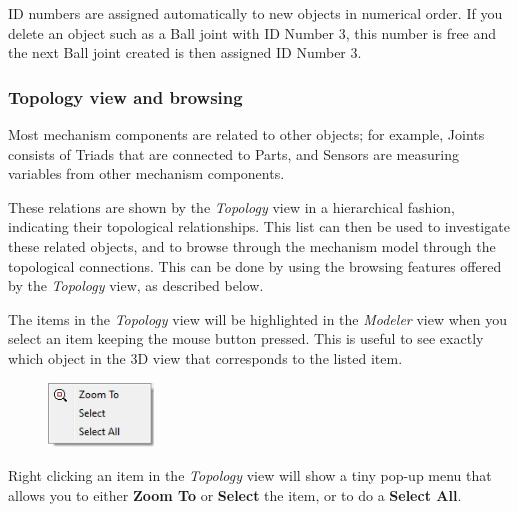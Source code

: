 
ID numbers are assigned automatically to new objects in numerical order.
If you delete an object such as a Ball joint with ID Number 3, this number
is free and the next Ball joint created is then assigned ID Number 3.

\subsubsection{Topology view and browsing}

Most mechanism components are related to other objects; for example, Joints
consists of Triads that are connected to Parts, and Sensors are measuring
variables from other mechanism components.

These relations are shown by the {\sl Topology} view in a hierarchical fashion,
indicating their topological relationships.
This list can then be used to investigate these related objects,
and to browse through the mechanism model through the topological connections.
This can be done by using the browsing features offered by the
{\sl Topology} view, as described below.

The items in the {\sl Topology} view will be highlighted in the {\sl Modeler}
view when you select an item keeping the mouse button pressed.
This is useful to see exactly which object in the 3D view that corresponds
to the listed item.

\begin{figure}
  \includegraphics[width=0.25\textwidth]{Figures/2-TopologyViewPopupMenu}
\end{figure}

Right clicking an item in the {\sl Topology} view will show a tiny pop-up
menu that allows you to either \textbf{Zoom To} or \textbf{Select} the
item, or to do a \textbf{Select All}.

